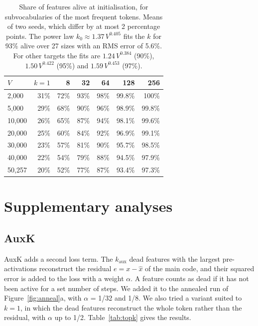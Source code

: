 \documentclass[11pt]{article}
\begin{document}
\begin{table}[h]
\centering
\small
\begin{tabular}{lrrrrrr}
\toprule
$V$ & $k = 1$ & 8 & 32 & 64 & 128 & 256 \\
\midrule
2,000 & 31\% & 72\% & 93\% & 98\% & 99.8\% & 100\% \\
5,000 & 29\% & 68\% & 90\% & 96\% & 98.9\% & 99.8\% \\
10,000 & 26\% & 65\% & 87\% & 94\% & 98.1\% & 99.6\% \\
20,000 & 25\% & 60\% & 84\% & 92\% & 96.9\% & 99.1\% \\
30,000 & 23\% & 57\% & 81\% & 90\% & 95.7\% & 98.5\% \\
40,000 & 22\% & 54\% & 79\% & 88\% & 94.5\% & 97.9\% \\
50,257 & 20\% & 52\% & 77\% & 87\% & 93.4\% & 97.3\% \\
\bottomrule
\end{tabular}
\caption{Share of features alive at initialisation, for subvocabularies of the most frequent tokens. Means of two seeds, which differ by at most 2 percentage points. The power law $k_0 \approx 1.37\,V^{0.405}$ fits the $k$ for 93\% alive over 27 sizes with an RMS error of 5.6\%. For other targets the fits are $1.24\,V^{0.384}$ (90\%), $1.50\,V^{0.422}$ (95\%) and $1.59\,V^{0.453}$ (97\%).}
\label{tab:init}
\end{table}

\clearpage
\section{Supplementary analyses}

\subsection{AuxK}
\label{app:auxk}

AuxK \cite{gao2024scaling} adds a second loss term. The $k_{\mathrm{aux}}$ dead features with the largest pre-activations reconstruct the residual $e = x - \hat{x}$ of the main code, and their squared error is added to the loss with a weight $\alpha$. A feature counts as dead if it has not been active for a set number of steps. We added it to the annealed run of Figure~\ref{fig:anneal}a, with $\alpha$ = 1/32 and 1/8. We also tried a variant suited to $k = 1$, in which the dead features reconstruct the whole token rather than the residual, with $\alpha$ up to 1/2. Table~\ref{tab:topk} gives the results.
\end{document}
